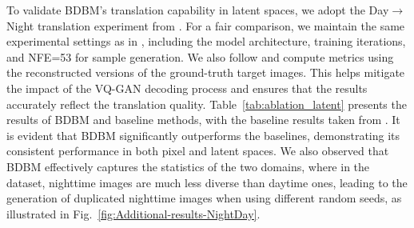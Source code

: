 To validate BDBM's translation capability in latent spaces, we adopt
the Day$\rightarrow$Night translation experiment from \cite{zhou2024denoising}.
For a fair comparison, we maintain the same experimental settings
as in \cite{zhou2024denoising}, including the model architecture,
training iterations, and NFE=53 for sample generation. We also follow
\cite{zhou2024denoising} and compute metrics using the reconstructed
versions of the ground-truth target images. This helps mitigate the
impact of the VQ-GAN decoding process and ensures that the results
accurately reflect the translation quality. Table~\ref{tab:ablation_latent}
presents the results of BDBM and baseline methods, with the baseline
results taken from \cite{zhou2024denoising}. It is evident that BDBM
significantly outperforms the baselines, demonstrating its consistent
performance in both pixel and latent spaces. We also observed that
BDBM effectively captures the statistics of the two domains, where
in the dataset, nighttime images are much less diverse than daytime
ones, leading to the generation of duplicated nighttime images when
using different random seeds, as illustrated in Fig.~\ref{fig:Additional-results-NightDay}.


